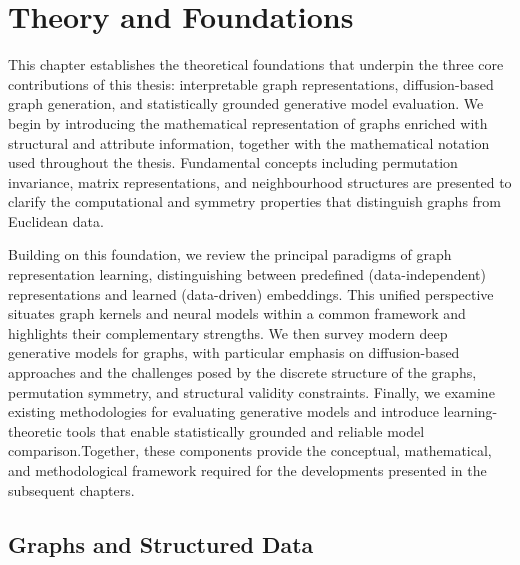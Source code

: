 \chapter{Theory and Foundations}
\label{ch:theory}

This chapter establishes the theoretical foundations that underpin the three
core contributions of this thesis: interpretable graph representations,
diffusion-based graph generation, and statistically grounded generative model
evaluation.
We begin by introducing the mathematical representation of graphs enriched with structural
and attribute information, together with the mathematical notation used
throughout the thesis. Fundamental concepts including permutation invariance,
matrix representations, and neighbourhood structures are presented to clarify
the computational and symmetry properties that distinguish graphs from
Euclidean data.

Building on this foundation, we review the principal paradigms of graph
representation learning, distinguishing between predefined
(data-independent) representations and learned (data-driven) embeddings.
This unified perspective situates graph kernels and neural models within a
common framework and highlights their complementary strengths.
We then survey modern deep generative models for graphs, with particular
emphasis on diffusion-based approaches and the challenges posed by the  
discrete structure of the graphs, permutation symmetry, and structural validity
constraints. Finally, we examine existing methodologies for evaluating generative models
and introduce learning-theoretic tools that enable statistically grounded and
reliable model comparison.Together, these components provide the conceptual, mathematical, and
methodological framework required for the developments presented in the
subsequent chapters.

\section{Graphs and Structured Data}


